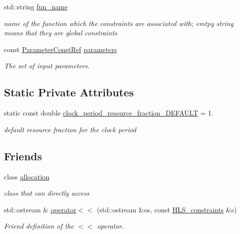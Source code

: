 \begin{DoxyCompactItemize}
std\+::string \hyperlink{classHLS__constraints_ab112ab399141c42790fc367163eb5534}{fun\+\_\+name}
\begin{DoxyCompactList}\small\item\em name of the function which the constraints are associated with; emtpy string means that they are global constraints \end{DoxyCompactList}\item 
const \hyperlink{Parameter_8hpp_a37841774a6fcb479b597fdf8955eb4ea}{Parameter\+Const\+Ref} \hyperlink{classHLS__constraints_a64ee4139f8b4f84b0ea40de253b3e3c5}{parameters}
\begin{DoxyCompactList}\small\item\em The set of input parameters. \end{DoxyCompactList}\end{DoxyCompactItemize}
\subsection*{Static Private Attributes}
\begin{DoxyCompactItemize}
\item 
static const double \hyperlink{classHLS__constraints_aa51dd0b45775afa572cd49fb686b14b6}{clock\+\_\+period\+\_\+resource\+\_\+fraction\+\_\+\+D\+E\+F\+A\+U\+LT} = 1.
\begin{DoxyCompactList}\small\item\em default resource fraction for the clock period \end{DoxyCompactList}\end{DoxyCompactItemize}
\subsection*{Friends}
\begin{DoxyCompactItemize}
\item 
class \hyperlink{classHLS__constraints_a2dc219c556df071c0061c3e9ddfa1dca}{allocation}
\begin{DoxyCompactList}\small\item\em class that can directly access \end{DoxyCompactList}\item 
std\+::ostream \& \hyperlink{classHLS__constraints_ac1bdf2eca4693e1be98bf968682c065f}{operator$<$$<$} (std\+::ostream \&os, const \hyperlink{classHLS__constraints}{H\+L\+S\+\_\+constraints} \&s)
\begin{DoxyCompactList}\small\item\em Friend definition of the $<$$<$ operator. \end{DoxyCompactList}\end{DoxyCompactItemize}


